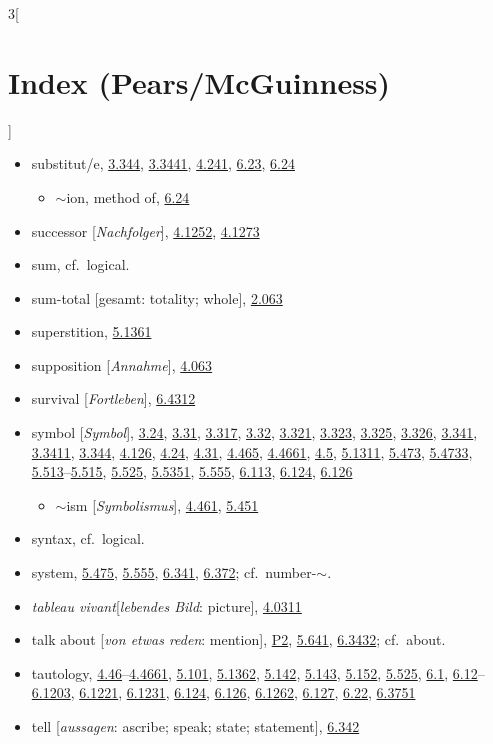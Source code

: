 \documentclass[oneside,openany,12pt]{book}
\newcommand{\indexentry}[1]{\item #1}
\newcommand{\indexsubentry}[1]{\begin{itemize} \item #1 \end{itemize}}
\newcommand{\indexref}[1]{\hyperlink{prop#1}{#1}}
\newcommand{\indexgap}{\bigskip}
\begin{document}
\begin{multicols}{3}[\section*{Index (Pears/McGuinness)}]
\begin{itemize}
\indexentry{substitut/e, \indexref{3.344}, \indexref{3.3441}, \indexref{4.241}, \indexref{6.23}, \indexref{6.24}}

   \indexsubentry{$\sim$ion, method of, \indexref{6.24}}

\indexentry{successor [\textit{Nachfolger}], \indexref{4.1252}, \indexref{4.1273}}

\indexentry{sum, cf.\ logical.}

\indexentry{sum-total [gesamt: totality; whole], \indexref{2.063}}

\indexentry{superstition, \indexref{5.1361}}

\indexentry{supposition [\textit{Annahme}], \indexref{4.063}}

\indexentry{survival [\textit{Fortleben}], \indexref{6.4312}}

\indexentry{symbol [\textit{Symbol}], \indexref{3.24}, \indexref{3.31}, \indexref{3.317}, \indexref{3.32}, \indexref{3.321}, \indexref{3.323}, \indexref{3.325}, \indexref{3.326}, \indexref{3.341}, \indexref{3.3411}, \indexref{3.344}, \indexref{4.126}, \indexref{4.24}, \indexref{4.31}, \indexref{4.465}, \indexref{4.4661}, \indexref{4.5}, \indexref{5.1311}, \indexref{5.473}, \indexref{5.4733}, \indexref{5.513}--\indexref{5.515}, \indexref{5.525}, \indexref{5.5351}, \indexref{5.555}, \indexref{6.113}, \indexref{6.124}, \indexref{6.126}}

   \indexsubentry{$\sim$ism [\textit{Symbolismus}], \indexref{4.461}, \indexref{5.451}}

\indexentry{syntax, cf.\ logical.}

\indexentry{system, \indexref{5.475}, \indexref{5.555}, \indexref{6.341}, \indexref{6.372}; cf.\ number-$\sim$.}

\indexgap

\indexentry{\textit{tableau vivant}[\textit{lebendes Bild}: picture], \indexref{4.0311}}

\indexentry{talk about [\textit{von etwas reden}: mention], \hyperlink{pref2}{P2}, \indexref{5.641}, \indexref{6.3432}; cf.\ about.}

\indexentry{tautology, \indexref{4.46}--\indexref{4.4661}, \indexref{5.101}, \indexref{5.1362}, \indexref{5.142}, \indexref{5.143}, \indexref{5.152}, \indexref{5.525}, \indexref{6.1}, \indexref{6.12}--\indexref{6.1203}, \indexref{6.1221}, \indexref{6.1231}, \indexref{6.124}, \indexref{6.126}, \indexref{6.1262}, \indexref{6.127}, \indexref{6.22}, \indexref{6.3751}}

\indexentry{tell [\textit{aussagen}: ascribe; speak; state; statement], \indexref{6.342}}


\end{itemize}
\end{multicols}
\end{document}
